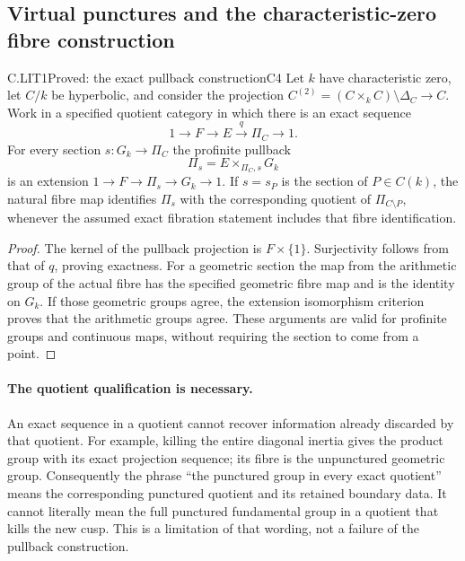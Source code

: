 \subsection{Virtual punctures and the characteristic-zero fibre construction}

\begin{claim}{C.LIT1}{Proved: the exact pullback construction}{C4}
Let $k$ have characteristic zero, let $C/k$ be hyperbolic, and consider
the projection $C^{(2)}=(C\times_k C)\setminus\Delta_C\to C$.
Work in a specified quotient category in which there is an exact
sequence
\[
 1\longrightarrow F\longrightarrow E\xrightarrow{q}\Pi_C
 \longrightarrow1.
\]
For every section $s:G_k\to\Pi_C$ the profinite pullback
\[
 \Pi_s=E\times_{\Pi_C,s}G_k
\]
is an extension $1\to F\to\Pi_s\to G_k\to1$. If $s=s_P$ is the
section of $P\in C(k)$, the natural fibre map identifies $\Pi_s$ with
the corresponding quotient of $\Pi_{C\setminus P}$, whenever the
assumed exact fibration statement includes that fibre identification.
\end{claim}
\begin{proof}
The kernel of the pullback projection is $F\times\{1\}$. Surjectivity
follows from that of $q$, proving exactness. For a geometric section
the map from the arithmetic group of the actual fibre has the specified
geometric fibre map and is the identity on $G_k$. If those geometric
groups agree, the extension isomorphism criterion proves that the
arithmetic groups agree. These arguments are valid for profinite groups
and continuous maps, without requiring the section to come from a point.
\end{proof}

\paragraph{The quotient qualification is necessary.}
An exact sequence in a quotient cannot recover information already
discarded by that quotient. For example, killing the entire diagonal
inertia gives the product group with its exact projection sequence;
its fibre is the unpunctured geometric group. Consequently the phrase
``the punctured group in every exact quotient'' means the corresponding
punctured quotient and its retained boundary data. It cannot literally
mean the full punctured fundamental group in a quotient that kills
the new cusp. This is a limitation of that wording, not a failure of
the pullback construction.


